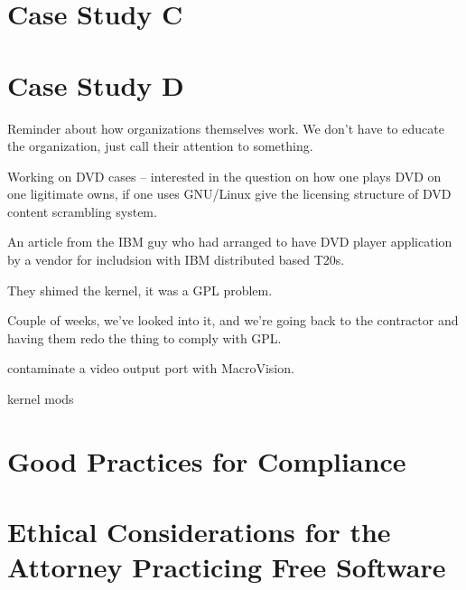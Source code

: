 \documentclass[12pt]{report}
\begin{document}
\chapter{Case Study C}

\chapter{Case Study D}

Reminder about how organizations themselves work.  We don't have to
educate the organization, just call their attention to something.

Working on DVD cases -- interested in the question on how one plays DVD
on one ligitimate owns, if one uses GNU/Linux give the licensing
structure of DVD content scrambling system.

An article from the IBM guy who had arranged to have DVD player
application by a vendor for includsion with IBM distributed based T20s.

They shimed the kernel, it was a GPL problem.

Couple of weeks, we've looked into it, and we're going back to the
contractor and having them redo the thing to comply with GPL.

contaminate a video output port with MacroVision.

kernel mods 

\chapter{Good Practices for Compliance}
\chapter{Ethical Considerations for the Attorney Practicing Free Software}
\end{document}
